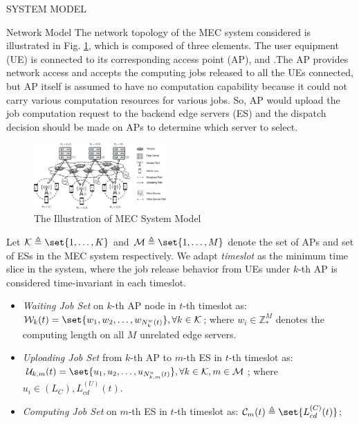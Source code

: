 \documentclass[10pt, conference, letterpaper]{IEEEtran}
\newcommand{\domZ}{\mathbb{Z}_{*}}
\DeclarePairedDelimiter\set\{\}
\newcommand{\apSet}{\mathcal{K}}
\newcommand{\esSet}{\mathcal{M}}
\newcommand{\wSet}{\mathcal{W}}
\newcommand{\uSet}{\mathcal{U}}
\newcommand{\cSet}{\mathcal{C}}
\begin{document}
    \begin{section}{SYSTEM MODEL}
        \label{sec:model}
        \begin{subsection}{Network Model}
            The network topology of the MEC system considered is illustrated in Fig. \ref{fig:system}, which is composed of three elements. The user equipment (UE) is connected to its corresponding access point (AP), and .The AP provides network access and accepts the computing jobs released to all the UEs connected, but AP itself is assumed to have no computation capability because it could not carry various computation resources for various jobs. So, AP would upload the job computation request to the backend edge servers (ES) and the dispatch decision should be made on APs to determine which server to select.
            \begin{figure}[ht]
                \centering
                \includegraphics[width=0.45\textwidth, trim={0.5cm 0.5cm 0.5cm 0.5cm}, clip]{system-model.pdf}
                \caption{The Illustration of MEC System Model}
                \label{fig:system}
            \end{figure}

            Let $\mathcal{K} \triangleq \set{1,\dots,K}$ and $\mathcal{M} \triangleq \set{1,\dots,M}$ denote the set of APs and set of ESs in the MEC system respectively. We adapt \emph{timeslot} as the minimum time slice in the system, where the job release behavior from UEs under $k$-th AP is considered time-invariant in each timeslot.
            \begin{itemize}
                \item \emph{Waiting Job Set} on $k$-th AP node in $t$-th timeslot as: $\wSet_{k}(t) = \set{w_1, w_2, \dots, w_{N^w_k(t)}}, \forall k \in \apSet$; where $w_i \in \domZ^M$ denotes the computing length on all $M$ unrelated edge servers.
                \item \emph{Uploading Job Set} from $k$-th AP to $m$-th ES in $t$-th timeslot as: $\uSet_{k,m}(t) = \set{u_1, u_2, \dots, u_{N^u_{k,m}(t)}}, \forall k \in \apSet, m \in \esSet$; where $u_i \in (L_C), L_{cd}^{(U)}(t)$.
                \item \emph{Computing Job Set} on $m$-th ES in $t$-th timeslot as: $\cSet_{m}(t) \triangleq \set{L_{cd}^{(C)}(t)}$;
            \end{itemize}


\end{subsection}
\end{section}
\end{document}
